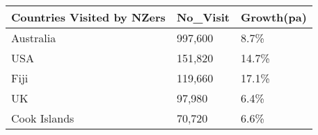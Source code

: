 \begin{tabular}[t]{|p{4.7cm}|p{1.25cm}|p{1.3cm}|}
  \hline
Countries Visited by NZers & No\_Visit & Growth(pa) \\ 
  \hline
Australia & 997,600 & 8.7\% \\ 
  USA & 151,820 & 14.7\% \\ 
  Fiji & 119,660 & 17.1\% \\ 
  UK &  97,980 & 6.4\% \\ 
  Cook Islands &  70,720 & 6.6\% \\ 
   \hline
\end{tabular}
